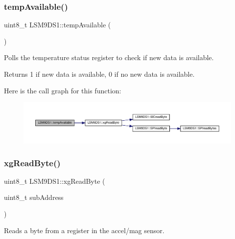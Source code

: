\subsubsection{\texorpdfstring{temp\+Available()}{tempAvailable()}}
{\footnotesize\ttfamily uint8\+\_\+t L\+S\+M9\+D\+S1\+::temp\+Available (\begin{DoxyParamCaption}{ }\end{DoxyParamCaption})}



Polls the temperature status register to check if new data is available. 

\begin{DoxyReturn}{Returns}
1 if new data is available, 0 if no new data is available. 
\end{DoxyReturn}
Here is the call graph for this function\+:
\nopagebreak
\begin{figure}[H]
\begin{center}
\leavevmode
\includegraphics[width=350pt]{classLSM9DS1_aaf6683c6f3f0281d5222b74f580f321b_cgraph}
\end{center}
\end{figure}
\mbox{\label{classLSM9DS1_af7f9789df6f0178764c815a3380c202a}} 
\subsubsection{\texorpdfstring{xg\+Read\+Byte()}{xgReadByte()}}
{\footnotesize\ttfamily uint8\+\_\+t L\+S\+M9\+D\+S1\+::xg\+Read\+Byte (\begin{DoxyParamCaption}\item[{uint8\+\_\+t}]{sub\+Address }\end{DoxyParamCaption})\hspace{0.3cm}{\ttfamily [protected]}}



Reads a byte from a register in the accel/mag sensor. 


